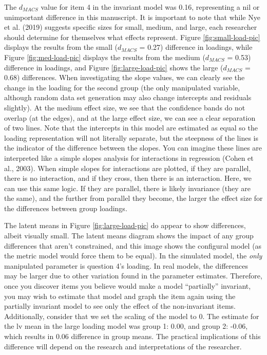 \documentclass[
  man]{apa7}
\begin{document}
The \(d_{MACS}\) value for item 4 in the invariant model was 0.16, representing a nil or unimportant difference in this manuscript. It is important to note that while Nye et al. (2019) suggests specific sizes for small, medium, and large, each researcher should determine for themselves what effects represent. Figure \ref{fig:small-load-pic} displays the results from the small (\(d_{MACS}\) = 0.27) difference in loadings, while Figure \ref{fig:med-load-pic} displays the results from the medium (\(d_{MACS}\) = 0.53) difference in loadings, and Figure \ref{fig:large-load-pic} shows the large (\(d_{MACS}\) = 0.68) differences. When investigating the slope values, we can clearly see the change in the loading for the second group (the only manipulated variable, although random data set generation may also change intercepts and residuals slightly). At the medium effect size, we see that the confidence bands do not overlap (at the edges), and at the large effect size, we can see a clear separation of two lines. Note that the intercepts in this model are estimated as equal so the loading representation will not literally separate, but the steepness of the lines is the indicator of the difference between the slopes. You can imagine these lines are interpreted like a simple slopes analysis for interactions in regression (Cohen et al., 2003). When simple slopes for interactions are plotted, if they are parallel, there is no interaction, and if they cross, then there is an interaction. Here, we can use this same logic. If they are parallel, there is likely invariance (they are the same), and the further from parallel they become, the larger the effect size for the differences between group loadings.

The latent means in Figure \ref{fig:large-load-pic} do appear to show differences, albeit visually small. The latent means diagram shows the impact of any group differences that aren't constrained, and this image shows the configural model (as the metric model would force them to be equal). In the simulated model, the \emph{only} manipulated parameter is question 4's loading. In real models, the differences may be larger due to other variation found in the parameter estimates. Therefore, once you discover items you believe would make a model ``partially'' invariant, you may wish to estimate that model and graph the item again using the partially invariant model to see only the effect of the non-invariant items. Additionally, consider that we set the scaling of the model to 0. The estimate for the lv mean in the large loading model was group 1: 0.00, and group 2: -0.06, which results in 0.06 difference in group means. The practical implications of this difference will depend on the research and interpretations of the researcher.
\end{document}
